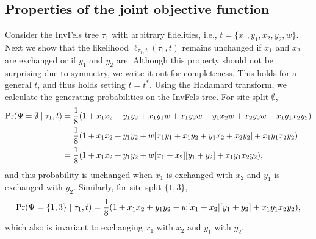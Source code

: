 \subsection*{Properties of the joint objective function}

Consider the InvFels tree $\tau_1$ with arbitrary fidelities, i.e., $t=\{x_1,y_1,x_2,y_2,w\}$.
Next we show that the likelihood $\ell_{\tau_1,t}(\tau_1, t)$ remains unchanged if $x_1$ and $x_2$ are exchanged or if $y_1$ and $y_2$ are.
Although this property should not be surprising due to symmetry, we write it out for completeness.
This holds for a general $t$, and thus holds setting $t=t^*$.
Using the Hadamard transform, we calculate the generating probabilities on the InvFels tree.
For site split $\emptyset$,
\begin{align*}
    \Pr(\Psi=\emptyset\mid \tau_1, t) & = \frac{1}{8} (1 + x_1x_2 +  y_1y_2 +  x_1y_1w + x_1y_2w + y_1x_2w + x_2y_2w + x_1y_1x_2y_2) \\
                                              & = \frac{1}{8} (1 + x_1x_2 +  y_1y_2 +  w[x_1y_1 + x_1y_2 + y_1x_2 + x_2y_2] + x_1y_1x_2y_2) \\
                                              & = \frac{1}{8} (1 + x_1x_2 +  y_1y_2 +  w[x_1 + x_2][y_1 + y_2] + x_1y_1x_2y_2),
\end{align*}
and this probability is unchanged when $x_1$ is exchanged with $x_2$ and $y_1$ is exchanged with $y_2$.
Similarly, for site split $\{1,3\}$,
\[
    \Pr(\Psi=\{1,3\}\mid \tau_1, t) = \frac{1}{8} (1 + x_1x_2 +  y_1y_2 -  w[x_1 + x_2][y_1 + y_2] + x_1y_1x_2y_2),
\]
which also is invariant to exchanging $x_1$ with $x_2$ and $y_1$ with $y_2$.

